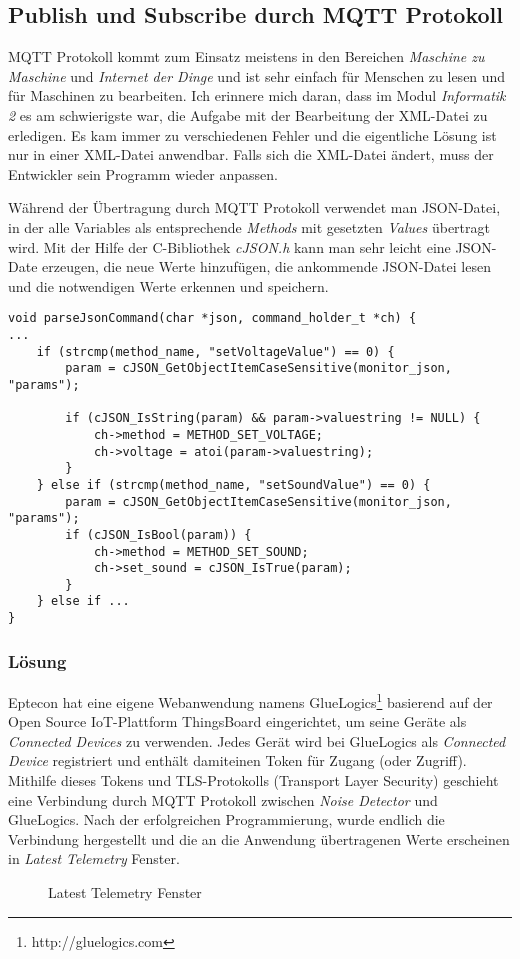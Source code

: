 \subsection{Publish und Subscribe durch MQTT Protokoll}
\label{sec:main:mqtt}
MQTT Protokoll kommt zum Einsatz meistens in den Bereichen \textit{Maschine zu Maschine} und \textit{Internet der Dinge} und ist sehr einfach für Menschen zu lesen und für Maschinen zu bearbeiten. Ich erinnere mich daran, dass im Modul \textit{Informatik 2} es am schwierigste war, die Aufgabe mit der Bearbeitung der XML-Datei zu erledigen. Es kam immer zu verschiedenen Fehler und die eigentliche Lösung ist nur in einer XML-Datei anwendbar. Falls sich die XML-Datei ändert, muss der Entwickler sein Programm wieder anpassen. 

Während der Übertragung durch MQTT Protokoll verwendet man JSON-Datei, in der alle Variables als entsprechende \textit{Methods} mit gesetzten \textit{Values} übertragt wird. Mit der Hilfe der C-Bibliothek \textit{cJSON.h} kann man sehr leicht eine JSON-Date erzeugen, die neue Werte hinzufügen, die ankommende JSON-Datei lesen und die notwendigen Werte erkennen und speichern. 
\begin{lstlisting}
void parseJsonCommand(char *json, command_holder_t *ch) {
...
	if (strcmp(method_name, "setVoltageValue") == 0) {
		param = cJSON_GetObjectItemCaseSensitive(monitor_json, "params");
	
		if (cJSON_IsString(param) && param->valuestring != NULL) {
			ch->method = METHOD_SET_VOLTAGE;
			ch->voltage = atoi(param->valuestring);
		}
	} else if (strcmp(method_name, "setSoundValue") == 0) {
		param = cJSON_GetObjectItemCaseSensitive(monitor_json, "params");
		if (cJSON_IsBool(param)) {
			ch->method = METHOD_SET_SOUND;
			ch->set_sound = cJSON_IsTrue(param);
		}
	} else if ...
}
\end{lstlisting}

\subsubsection{Lösung}
Eptecon hat eine eigene Webanwendung namens GlueLogics\footnote{http://gluelogics.com} basierend auf der Open Source IoT-Plattform ThingsBoard eingerichtet, um seine Geräte als \textit{Connected Devices} zu verwenden. Jedes Gerät wird bei GlueLogics als \textit{Connected Device} registriert und enthält damiteinen Token für Zugang (oder Zugriff). Mithilfe dieses Tokens und TLS-Protokolls (Transport Layer Security) geschieht eine Verbindung durch MQTT Protokoll zwischen \textit{Noise Detector} und GlueLogics. Nach der erfolgreichen Programmierung, wurde endlich die Verbindung hergestellt und die an die Anwendung übertragenen Werte erscheinen in \textit{Latest Telemetry} Fenster. 
\begin{figure}[h]
	\centering
	\caption{Latest Telemetry Fenster}
	\label{fig:tele}
\end{figure}

